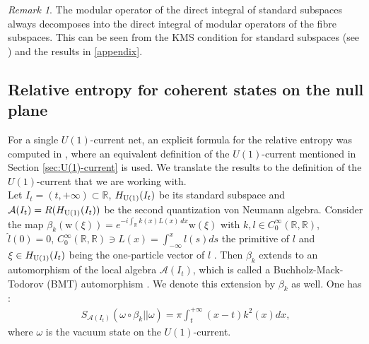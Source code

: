 \documentclass[12pt]{article}
\def\RR{{\mathbb R}}
\def\A{{\mathcal A}}
\def\b{\beta}
\def\uone{{\rm U(1)}}
\theoremstyle{remark}
\newtheorem{remark}[theorem]{Remark}
\begin{document}
\begin{remark}
	The modular operator of the direct integral of standard subspaces always decomposes into the direct integral of modular operators of the fibre subspaces. This can be seen from the KMS condition for standard subspaces (see \cite[Proposition 2.1.8]{Longo08}) and the results in \autoref{appendix}.
\end{remark}


\subsection{Relative entropy for coherent states on the null plane}

For a single $U(1)$-current net, an explicit formula for the relative entropy was computed in \cite{LongoLocalised},
where an equivalent definition of the $U(1)$-current mentioned in Section \ref{sec:U(1)-current} is used.
We translate the results to the definition of the $U(1)$-current that we are working with. \\
Let $I_t=(t,+\infty)\subset\RR$, $H_\uone(I_t)$ be its standard subspace  and $\A(I_t)=R(H_\uone(I_t))$ be the second quantization von Neumann algebra. 
Consider the map $\beta_k(\mathrm w(\xi))=e^{-i\int_\RR k(x)L(x)\,dx}\mathrm w(\xi)$ with  $k,l\in C_0^\infty(\RR,\RR)$, $\hat{l}(0)=0$, $C_0^\infty(\RR,\RR)\ni L(x)=\int_{-\infty}^xl(s)ds$ the primitive of $l$ and $\xi\in H_\uone(I_t)$ being the one-particle vector of $l$ . Then $\b_k$ extends to an automorphism of the local algebra $\A(I_t)$, which is called a Buchholz-Mack-Todorov (BMT) automorphism \cite{BMT88}.
We denote this extension by $\b_k$ as well. One has \cite[Theorem 4.7]{LongoLocalised}:
\begin{align*}
S_{\A(I_t)}(\omega\circ\beta_k||\omega)=\pi\int_t^{+\infty}(x-t) k^2(x)dx,
\end{align*}
where $\omega$ is the vacuum state on the $U(1)$-current.
\end{document}

